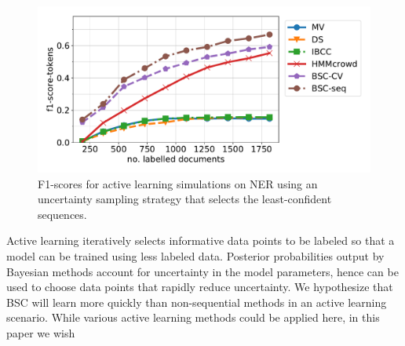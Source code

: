  \begin{figure}[h]
 \centering
   \includegraphics[width=1\columnwidth, clip=True, trim=40 22 22 15]{figures/NER_AL/pool/plot_f1-score-tokens.pdf}
 \caption{F1-scores for active learning simulations on NER using an uncertainty sampling strategy that selects the least-confident sequences.
 }
 \label{fig:alner}
 \end{figure}
 Active learning iteratively selects informative data points to be labeled so that a model can be trained
 using less labeled data. Posterior probabilities output by Bayesian methods 
 account for uncertainty in the model parameters, hence can be used to choose data points that rapidly reduce uncertainty. 
 We hypothesize that BSC will learn more quickly than non-sequential methods
 in an active learning scenario. 
 While various active learning methods could be applied here, in this paper we wish
